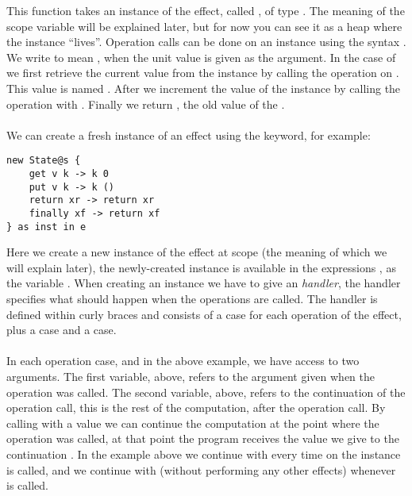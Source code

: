 This function takes an instance of the  effect, called , of type .
The meaning of the scope variable  will be explained later, but for now you can see it as a heap where the instance ``lives''.
Operation calls can be done on an instance using the syntax .
We write  to mean , when the unit value \ident{()} is given as the argument.
In the case of  we first retrieve the current value from the instance by calling the  operation on .
This value is named .
After we increment the value of the instance by calling the  operation with .
Finally we return , the old value of the .
\\\\
We can create a fresh instance of an effect using the  keyword, for example:
\begin{verbatim}
new State@s {
	get v k -> k 0
	put v k -> k ()
	return xr -> return xr
	finally xf -> return xf
} as inst in e
\end{verbatim}
Here we create a new instance of the  effect at scope  (the meaning of which we will explain later), the newly-created instance is available in the expressions , as the variable .
When creating an instance we have to give an \emph{handler}, the handler specifies what should happen when the operations are called.
The handler is defined within curly braces and consists of a case for each operation of the effect, plus a  case and a  case.
\\\\
In each operation case,  and  in the above example, we have access to two arguments.
The first variable,  above, refers to the argument given when the operation was called.
The second variable,  above, refers to the continuation of the operation call, this is the rest of the computation, after the operation call.
By calling  with a value we can continue the computation at the point where the operation was called, at that point the program receives the value we give to the continuation .
In the example above we continue with  every time  on the instance  is called, and we continue with \ident{()} (without performing any other effects) whenever  is called.
\\\\
